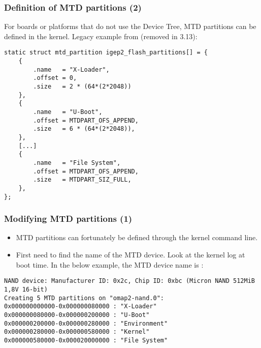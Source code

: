 \begin{frame}[fragile]
  \frametitle{Definition of MTD partitions (2)}
  For boards or platforms that do not use the Device Tree,
  MTD partitions can be defined in the kernel.
  Legacy example from 
  (removed in 3.13):
\begin{verbatim}
static struct mtd_partition igep2_flash_partitions[] = {
    {
        .name   = "X-Loader",
        .offset = 0,
        .size   = 2 * (64*(2*2048))
    },
    {
        .name   = "U-Boot",
        .offset = MTDPART_OFS_APPEND,
        .size   = 6 * (64*(2*2048)),
    },
    [...]
    {
        .name   = "File System",
        .offset = MTDPART_OFS_APPEND,
        .size   = MTDPART_SIZ_FULL,
    },
};
\end{verbatim}
\end{frame}

\begin{frame}[fragile]
  \frametitle{Modifying MTD partitions (1)}
  \begin{itemize}
  \item MTD partitions can fortunately be defined through the kernel
    command line.
  \item First need to find the name of the MTD device. Look at the
    kernel log at boot time. In the below example, the MTD device name is
    :
\end{itemize}
\tiny
\begin{verbatim}
NAND device: Manufacturer ID: 0x2c, Chip ID: 0xbc (Micron NAND 512MiB 1,8V 16-bit)
Creating 5 MTD partitions on "omap2-nand.0":
0x000000000000-0x000000080000 : "X-Loader"
0x000000080000-0x000000200000 : "U-Boot"
0x000000200000-0x000000280000 : "Environment"
0x000000280000-0x000000580000 : "Kernel"
0x000000580000-0x000020000000 : "File System"
\end{verbatim}
\end{frame}

